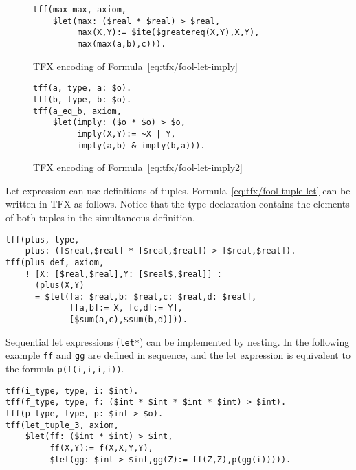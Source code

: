 \begin{figure}[htbp]
\begin{lstlisting}[language=tptp]
tff(max_max, axiom,
    $let(max: ($real * $real) > $real,
         max(X,Y):= $ite($greatereq(X,Y),X,Y),
         max(max(a,b),c))).
\end{lstlisting}
\caption{TFX encoding of Formula~\ref{eq:tfx/fool-let-imply}}
\label{fig:tfx/let-tfx}
\end{figure}

\begin{figure}[htbp]
\begin{lstlisting}[language=tptp]
tff(a, type, a: $o).
tff(b, type, b: $o).
tff(a_eq_b, axiom,
    $let(imply: ($o * $o) > $o,
         imply(X,Y):= ~X | Y,
         imply(a,b) & imply(b,a))).
\end{lstlisting}
\caption{TFX encoding of Formula~\ref{eq:tfx/fool-let-imply2}}
\label{fig:tfx/let-tfx2}
\end{figure}


Let expression can use definitions of tuples. 
Formula~\ref{eq:tfx/fool-tuple-let} can be written in TFX as follows. 
Notice that the type declaration contains the elements of both tuples in 
the simultaneous definition.
\begin{lstlisting}[language=tptp]
tff(plus, type,
    plus: ([$real,$real] * [$real,$real]) > [$real,$real]).
tff(plus_def, axiom,
    ! [X: [$real,$real],Y: [$real$,$real]] :
      (plus(X,Y) 
      = $let([a: $real,b: $real,c: $real,d: $real],
             [[a,b]:= X, [c,d]:= Y],
             [$sum(a,c),$sum(b,d)])).
\end{lstlisting}

Sequential let expressions (\verb'let*') can be implemented by nesting. 
In the following example \lstinline'ff' and \lstinline'gg' are defined in sequence, and the let expression is equivalent to the formula \lstinline'p(f(i,i,i,i))'.
\begin{lstlisting}[language=tptp]
tff(i_type, type, i: $int).
tff(f_type, type, f: ($int * $int * $int * $int) > $int).
tff(p_type, type, p: $int > $o).
tff(let_tuple_3, axiom,
    $let(ff: ($int * $int) > $int,
         ff(X,Y):= f(X,X,Y,Y),
         $let(gg: $int > $int,gg(Z):= ff(Z,Z),p(gg(i))))).
\end{lstlisting}

